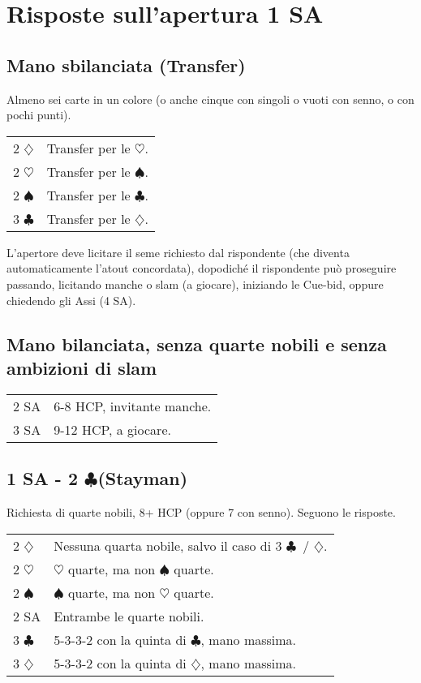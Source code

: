 \documentclass[a4paper,10pt]{article}
\renewcommand{\c}{$\clubsuit$\xspace}
\renewcommand{\d}{$\diamondsuit$\xspace}
\newcommand{\h}{$\heartsuit$\xspace}
\newcommand{\s}{$\spadesuit$\xspace}
\newcommand{\sa}{SA\xspace}
\newcommand{\smallspace}{\vskip0.3cm}
\newenvironment{twocol}
  {\smallspace\noindent\begin{tabular}{l p{0.78\textwidth}}}
  {\end{tabular}\smallspace}
\begin{document}
\pagebreak

\section{Risposte sull'apertura 1 SA}

\subsection{Mano sbilanciata (Transfer)}

Almeno sei carte in un colore (o anche cinque con singoli o vuoti con senno, o con pochi punti).

\begin{twocol}
 2 \d & Transfer per le \h.\\
 2 \h & Transfer per le \s.\\
 2 \s & Transfer per le \c.\\
 3 \c & Transfer per le \d.\\
\end{twocol}

L'apertore deve licitare il seme richiesto dal rispondente (che diventa automaticamente l'atout concordata), dopodiché il rispondente può proseguire passando, licitando manche o slam (a giocare), iniziando le Cue-bid, oppure chiedendo gli Assi (4 \sa).


\subsection{Mano bilanciata, senza quarte nobili e senza ambizioni di slam}

\begin{twocol}
 2 \sa & 6-8 HCP, invitante manche.\\
 3 \sa & 9-12 HCP, a giocare.
\end{twocol}


\subsection{1 SA - 2 \c (Stayman)}

Richiesta di quarte nobili, 8+ HCP (oppure 7 con senno). Seguono le risposte.

\begin{twocol}
 2 \d & Nessuna quarta nobile, salvo il caso di 3 \c\ / \d.\\
 2 \h & \h quarte, ma non \s quarte.\\
 2 \s & \s quarte, ma non \h quarte.\\
 2 \sa & Entrambe le quarte nobili.\\
 3 \c & 5-3-3-2 con la quinta di \c, mano massima.\\
 3 \d & 5-3-3-2 con la quinta di \d, mano massima.\\
\end{twocol}
\end{document}
